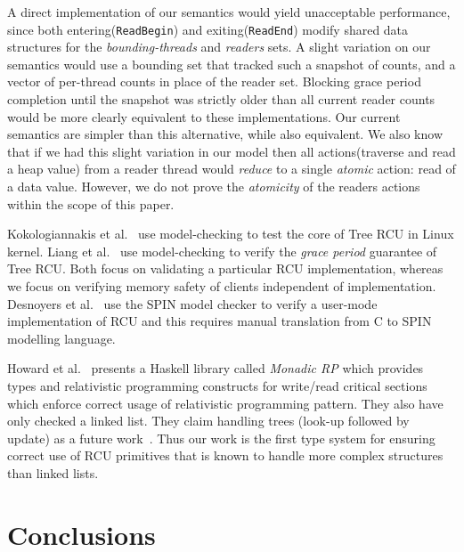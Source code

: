  A direct implementation of our semantics would yield unacceptable performance, since both entering(\lstinline|ReadBegin|) and exiting(\lstinline|ReadEnd|) modify shared data structures for the \textit{bounding-threads} and \textit{readers} sets. A slight variation on our semantics would use a bounding set  that tracked such a snapshot of counts, and a vector of per-thread counts in place of the reader set. Blocking grace period completion until the snapshot was strictly older than all current reader counts would be more clearly equivalent to these implementations. Our current semantics are simpler than this alternative, while also equivalent. We also know that if we had this slight variation in our model then all actions(traverse and read a heap value) from a reader thread would \textit{reduce} to a single \textit{atomic} action: read of a data value. However, we do not prove the \textit{atomicity} of the readers actions within the scope of this paper.

 Kokologiannakis et al.~\cite{Kokologiannakis:2017:SMC:3092282.3092287} use model-checking to test the core of \textsf{Tree RCU} in Linux kernel. Liang et al.~\cite{LiangMKM16} use model-checking to verify the \emph{grace period} guarantee of \textsf{Tree RCU}. Both focus on validating a particular RCU implementation, whereas we focus on verifying memory safety of clients independent of implementation. Desnoyers et al.~\cite{urcu_ieee} use the \textsf{SPIN} model checker to verify a user-mode implementation of RCU and this requires manual translation from C to SPIN modelling language.

Howard et al.~\cite{Howard:2011:RES:2001252.2001267,Cooper2015RelativisticPI} presents a \textsf{Haskell} library called \emph{Monadic RP} which provides types and relativistic programming constructs for write/read critical sections which enforce correct usage of relativistic programming pattern. They also have only checked a linked list. They claim  handling trees (look-up followed by update) as a future work~\cite{Howard:2011:RES:2001252.2001267}. Thus our work is the first type system for ensuring correct use of RCU primitives that is known to handle more complex structures than linked lists.
\section{Conclusions}
\label{sec:concls}
